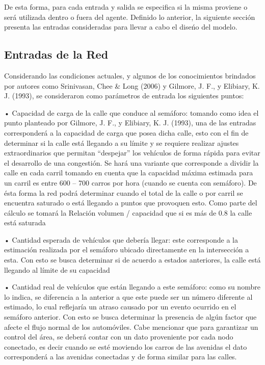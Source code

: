 De esta forma, para cada entrada y salida se especifica si la misma proviene o ser\'{a} utilizada dentro o fuera del agente. Definido lo anterior, la siguiente secci\'{o}n presenta las entradas consideradas para llevar a cabo el dise\'{n}o del modelo.


\subsection{Entradas de la Red}

Considerando las condiciones actuales, y algunos de los conocimientos brindados por autores como Srinivasan, Chee & Long (2006) y Gilmore, J. F., y Elibiary, K. J. (1993), se consideraron como par\'{a}metros de entrada los siguientes puntos:

•	Capacidad de carga de la calle que conduce al sem\'{a}foro: tomando como idea el punto planteado por Gilmore, J. F., y Elibiary, K. J. (1993), una de las entradas corresponder\'{a} a la capacidad de carga que posea dicha calle, esto con el fin de determinar si la calle est\'{a} llegando a su l\'{i}mite y se requiere realizar ajustes extraordinarios que permitan “despejar” los veh\'{i}culos de forma r\'{a}pida para evitar el desarrollo de una congesti\'{o}n. Se har\'{a} una variante que corresponde a dividir la calle en cada carril tomando en cuenta que la capacidad m\'{a}xima estimada para un  carril es entre 600 – 700 carros por hora (cuando se cuenta con sem\'{a}foro). De \'{e}sta forma la red podr\'{a} determinar cuando el total de la calle o por carril se encuentra saturado o est\'{a} llegando a puntos que provoquen esto. Como parte del c\'{a}lculo se tomar\'{a} la Relaci\'{o}n volumen / capacidad que si es m\'{a}s de 0.8 la calle est\'{a} saturada

•	Cantidad esperada de veh\'{i}culos que deber\'{i}a llegar: este corresponde a la estimaci\'{o}n realizada por el sem\'{a}foro ubicado directamente en la intersecci\'{o}n a esta. Con esto se busca determinar si de acuerdo a estados anteriores, la calle est\'{a} llegando al l\'{i}mite de su capacidad

•	Cantidad real de veh\'{i}culos que est\'{a}n llegando a este sem\'{a}foro: como su nombre lo indica, se diferencia a la anterior a que este puede ser un n\'{u}mero diferente al estimado, lo cual reflejar\'{i}a un atraso causado por un evento ocurrido en el sem\'{a}foro anterior. Con esto se busca determinar la presencia de alg\'{u}n factor que afecte el flujo normal de los autom\'{o}viles. Cabe mencionar que para garantizar un control del \'{a}rea, se deber\'{a} contar con un dato proveniente por cada nodo conectado, es decir cuando se est\'{e} moviendo los carros de las avenidas el dato corresponder\'{a} a las avenidas conectadas y de forma similar para las calles.

